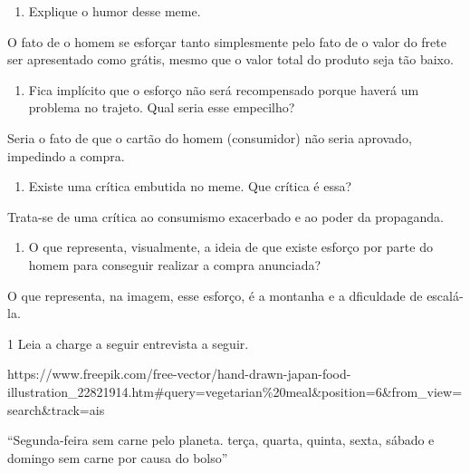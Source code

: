 \begin{itemize}
\begin{itemize}
{\begin{itemize}
\begin{itemize}
\begin{enumerate}
\def\labelenumi{\arabic{enumi}.}
\setcounter{enumi}{6}
\tightlist
\item
  Explique o humor desse meme.
\end{enumerate}


O fato de o homem se esforçar tanto simplesmente pelo fato de o valor do
frete ser apresentado como grátis, mesmo que o valor total do produto
seja tão baixo.

\begin{enumerate}
\def\labelenumi{\arabic{enumi}.}
\setcounter{enumi}{7}
\tightlist
\item
  Fica implícito que o esforço não será recompensado porque haverá um
  problema no trajeto. Qual seria esse empecilho?
\end{enumerate}


Seria o fato de que o cartão do homem (consumidor) não seria aprovado,
impedindo a compra.

\begin{enumerate}
\def\labelenumi{\arabic{enumi}.}
\setcounter{enumi}{8}
\tightlist
\item
  Existe uma crítica embutida no meme. Que crítica é essa?
\end{enumerate}


Trata-se de uma crítica ao consumismo exacerbado e ao poder da
propaganda.

\begin{enumerate}
\def\labelenumi{\arabic{enumi}.}
\setcounter{enumi}{9}
\tightlist
\item
  O que representa, visualmente, a ideia de que existe esforço por parte
  do homem para conseguir realizar a compra anunciada?
\end{enumerate}


O que representa, na imagem, esse esforço, é a montanha e a dficuldade
de escalá-la.


\num{1} Leia a charge a seguir entrevista a seguir.

https://www.freepik.com/free-vector/hand-drawn-japan-food-illustration\_22821914.htm\#query=vegetarian\%20meal\&position=6\&from\_view=search\&track=ais

``Segunda-feira sem carne pelo planeta. terça, quarta, quinta, sexta,
sábado e domingo sem carne por causa do bolso''


\end{itemize}
\end{itemize}}
\end{itemize}
\end{itemize}
